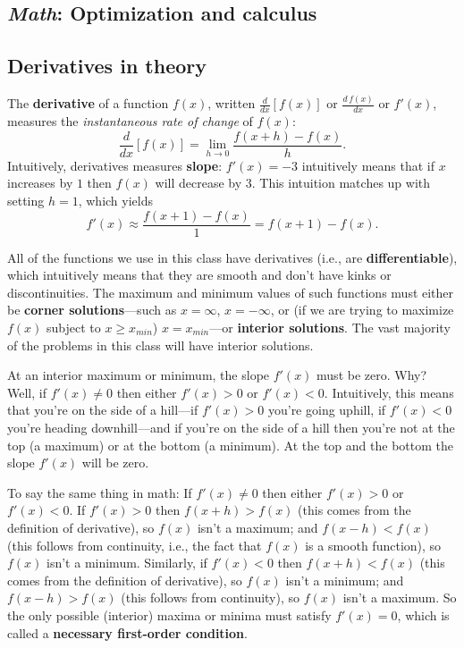 \begin{CALCULUS}

\section{\emph{Math}: Optimization and calculus}


\subsection*{Derivatives in theory}

The \textbf{derivative} of a function $f(x)$, written $\displaystyle \frac{d}{dx}\left[ f(x)\right]$ or $\displaystyle \frac{d\,  f(x)}{dx}$ or $f'(x)$, measures the \emph{instantaneous rate of change} of $f(x)$:
\[
\frac{d}{dx}\left[ f(x)\right] = \lim_{h\rightarrow 0} \frac{f(x+h) - f(x)}{h}.
\]
%
Intuitively, derivatives measures \textbf{slope}: $f'(x)=-3$ intuitively means that if $x$ increases by $1$ then $f(x)$ will decrease by $3$. This intuition matches up with setting $h=1$, which yields
\[
f'(x)\approx \frac{f(x+1)-f(x)}{1} = f(x+1)-f(x).
\]

All of the functions we use in this class have derivatives (i.e., are \textbf{differentiable}), which intuitively means that they are smooth and don't have kinks or discontinuities. The maximum and minimum values of such functions must either be \textbf{corner solutions}---such as $x=\infty$, $x=-\infty$, or (if we are trying to maximize $f(x)$ subject to $x\geq x_{min}$) $x=x_{min}$---or \textbf{interior solutions}. The vast majority of the problems in this class will have interior solutions.

At an interior maximum or minimum, the slope $f'(x)$ must be zero. Why? Well, if $f'(x)\neq 0$ then either $f'(x)>0$ or $f'(x)<0$. Intuitively, this means that you're on the side of a hill---if $f'(x)>0$ you're going uphill, if $f'(x)<0$ you're heading downhill---and if you're on the side of a hill then you're not at the top (a maximum) or at the bottom (a minimum). At the top and the bottom the slope $f'(x)$ will be zero.

To say the same thing in math: If $f'(x)\neq 0$ then either $f'(x)>0$ or $f'(x)<0$. If $f'(x)>0$ then $f(x+h)>f(x)$ (this comes from the definition of derivative), so $f(x)$ isn't a maximum; and $f(x-h)<f(x)$ (this follows from continuity, i.e., the fact that $f(x)$ is a smooth function), so $f(x)$ isn't a minimum. Similarly, if $f'(x)<0$ then $f(x+h)<f(x)$ (this comes from the definition of derivative), so $f(x)$ isn't a minimum; and $f(x-h)>f(x)$ (this follows from continuity), so $f(x)$ isn't a maximum. So the only possible (interior) maxima or minima must satisfy $f'(x)=0$, which is called a \textbf{necessary first-order condition}.


\end{CALCULUS}
